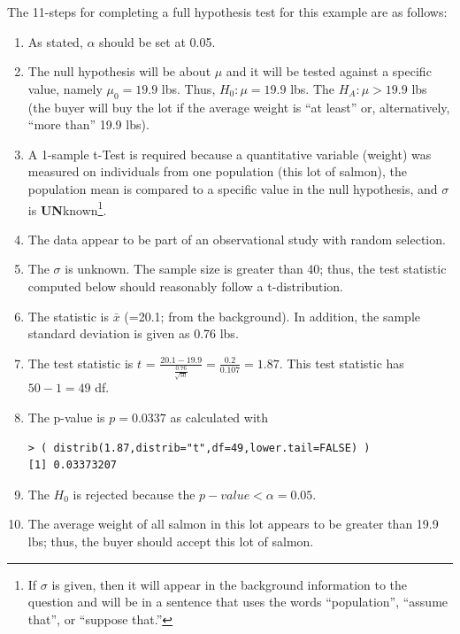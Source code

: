 \documentclass[10pt,openany]{book}\usepackage[]{graphicx}\usepackage[]{color}
\makeatletter
\newenvironment{kframe}{%
 \def\at@end@of@kframe{}%
 \ifinner\ifhmode%
  \def\at@end@of@kframe{\end{minipage}}%
  \begin{minipage}{\columnwidth}%
 \fi\fi%
 \def\FrameCommand##1{\hskip\@totalleftmargin \hskip-\fboxsep
 \colorbox{shadecolor}{##1}\hskip-\fboxsep
     \hskip-\linewidth \hskip-\@totalleftmargin \hskip\columnwidth}%
 \MakeFramed {\advance\hsize-\width
   \@totalleftmargin\z@ \linewidth\hsize
   \@setminipage}}%
 {\par\unskip\endMakeFramed%
 \at@end@of@kframe}
\newenvironment{knitrout}{}{} %
\makeatother
\begin{document}
The 11-steps  for completing a full hypothesis test for this example are as follows:
\begin{enumerate}
    \item As stated, $\alpha$ should be set at 0.05.
    \item The null hypothesis will be about $\mu$ and it will be tested against a specific value, namely $\mu_{0}=19.9$ lbs.  Thus, $H_{0}:\mu=19.9$ lbs.  The $H_{A}:\mu >19.9$ lbs (the buyer will buy the lot if the average weight is ``at least'' or, alternatively, ``more than'' 19.9 lbs).
    \item A 1-sample t-Test is required because a quantitative variable (weight) was measured on individuals from one population (this lot of salmon), the population mean is compared to a specific value in the null hypothesis, and $\sigma$ is \textbf{UN}known\footnote{If $\sigma$ is given, then it will appear in the background information to the question and will be in a sentence that uses the words ``population'', ``assume that'', or ``suppose that.''}.
    \item The data appear to be part of an observational study with random selection.
    \item The $\sigma$ is unknown.  The sample size is greater than 40; thus, the test statistic computed below should reasonably follow a t-distribution.
    \item The statistic is $\bar{x}$ (=20.1; from the background).  In addition, the sample standard deviation is given as 0.76 lbs.
    \item The test statistic is $t$ = $\frac{20.1-19.9}{\frac{0.76}{\sqrt{50}}} = \frac{0.2}{0.107} = 1.87$.  This test statistic has $50-1=49$ df.
    \item The p-value is $p=0.0337$ as calculated with
\begin{knitrout}
\color{fgcolor}\begin{kframe}
\begin{verbatim}
> ( distrib(1.87,distrib="t",df=49,lower.tail=FALSE) )
[1] 0.03373207
\end{verbatim}
\end{kframe}
\end{knitrout}
    \item The $H_{0}$ is rejected because the $p-value < \alpha=0.05$.
    \item The average weight of all salmon in this lot appears to be greater than 19.9 lbs; thus, the buyer should accept this lot of salmon.

\end{enumerate}
\end{document}
